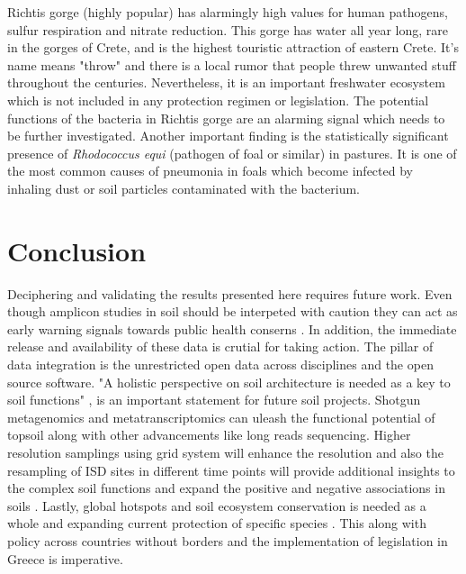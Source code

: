 Richtis gorge (highly popular) has alarmingly high values for human pathogens, sulfur respiration and
nitrate reduction. This gorge has water all year long, rare in the gorges of Crete,
and is the highest touristic attraction of eastern Crete. It's name means "throw" and 
there is a local rumor that people threw unwanted stuff throughout the centuries. 
Nevertheless, it is an important freshwater ecosystem which is not included in 
any protection regimen or legislation.
The potential functions of the bacteria in Richtis gorge are an alarming signal which needs to be further investigated.
Another important finding is the statistically significant presence of \textit{Rhodococcus equi} (pathogen of foal or similar)
in pastures. It is one of the most common causes of pneumonia in foals which
become infected by inhaling dust or soil particles contaminated with the bacterium.

\section{Conclusion}

Deciphering and validating the results presented here requires future work.
Even though amplicon studies in soil should be interpeted with caution \parencite{alteio2021} they 
can act as early warning signals towards public health conserns \parencite{banerjee2023Soil}.
In addition, the immediate release and availability of these data is crutial for 
taking action.
The pillar of data integration is the unrestricted open data across disciplines and 
the open source software.
"A holistic perspective on soil architecture is needed as a key to soil functions" \parencite{philippot2024the-interplay}, is 
an important statement for future soil projects.
Shotgun metagenomics and metatranscriptomics can uleash the functional potential of
topsoil along with other advancements like long reads sequencing. Higher resolution
samplings using grid system will enhance the resolution and also the resampling of
ISD sites in different time points will provide additional insights to the complex soil 
functions and expand the positive and negative associations in soils \parencite{Liu2024}.
Lastly, global hotspots \parencite{Guerra2022} and soil ecosystem conservation is needed as 
a whole and expanding current protection of specific species \parencite{guerra2021tracking}.
This along with policy \parencite{KONINGER2022} across countries \parencite{Putten2023}
without borders and the implementation of legislation in Greece \parencite{SCHISMENOS2022100035} is 
imperative.


